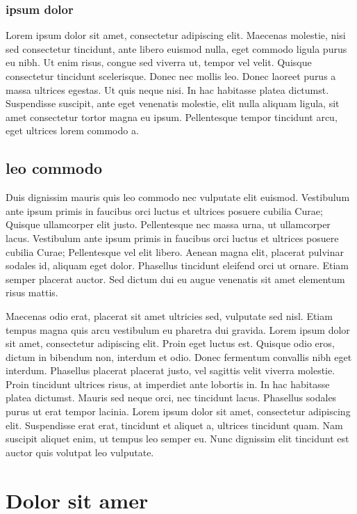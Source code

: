\documentclass[twoside,emptyfirstpagenumber,swedish]{../thesis}
\begin{document}
\subsubsection{ipsum dolor}
Lorem ipsum dolor sit amet, consectetur adipiscing elit. Maecenas molestie, nisi sed consectetur tincidunt, ante libero euismod nulla, eget commodo ligula purus eu nibh. Ut enim risus, congue sed viverra ut, tempor vel velit. Quisque consectetur tincidunt scelerisque. Donec nec mollis leo. Donec laoreet purus a massa ultrices egestas. Ut quis neque nisi. In hac habitasse platea dictumst. Suspendisse suscipit, ante eget venenatis molestie, elit nulla aliquam ligula, sit amet consectetur tortor magna eu ipsum. Pellentesque tempor tincidunt arcu, eget ultrices lorem commodo a.

\subsection{leo commodo}

Duis dignissim mauris quis leo commodo nec vulputate elit euismod. Vestibulum ante ipsum primis in faucibus orci luctus et ultrices posuere cubilia Curae; Quisque ullamcorper elit justo. Pellentesque nec massa urna, ut ullamcorper lacus. Vestibulum ante ipsum primis in faucibus orci luctus et ultrices posuere cubilia Curae; Pellentesque vel elit libero. Aenean magna elit, placerat pulvinar sodales id, aliquam eget dolor. Phasellus tincidunt eleifend orci ut ornare. Etiam semper placerat auctor. Sed dictum dui eu augue venenatis sit amet elementum risus mattis.

Maecenas odio erat, placerat sit amet ultricies sed, vulputate sed nisl. Etiam tempus magna quis arcu vestibulum eu pharetra dui gravida. Lorem ipsum dolor sit amet, consectetur adipiscing elit. Proin eget luctus est. Quisque odio eros, dictum in bibendum non, interdum et odio. Donec fermentum convallis nibh eget interdum. Phasellus placerat placerat justo, vel sagittis velit viverra molestie. Proin tincidunt ultrices risus, at imperdiet ante lobortis in. In hac habitasse platea dictumst. Mauris sed neque orci, nec tincidunt lacus. Phasellus sodales purus ut erat tempor lacinia. Lorem ipsum dolor sit amet, consectetur adipiscing elit. Suspendisse erat erat, tincidunt et aliquet a, ultrices tincidunt quam. Nam suscipit aliquet enim, ut tempus leo semper eu. Nunc dignissim elit tincidunt est auctor quis volutpat leo vulputate.

\section{Dolor sit amer}
\end{document}
